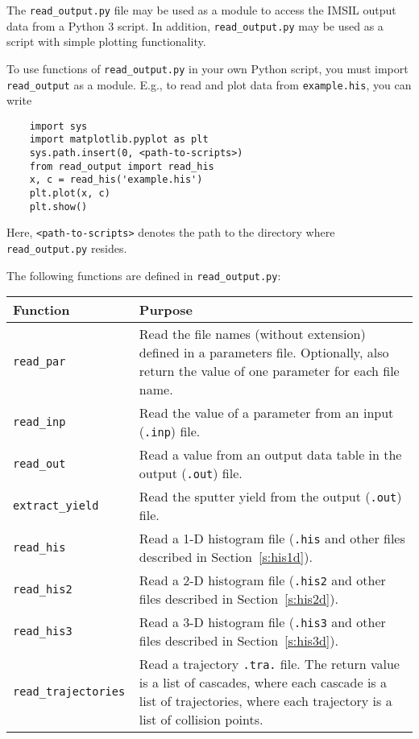 The \texttt{read\_output.py} file may be used as a module to access the IMSIL
output data from a Python 3 script. In addition, \texttt{read\_output.py} may be
used as a script with simple plotting functionality. 

To use functions of \texttt{read\_output.py} in your own Python script, you must
import \texttt{read\_output} as a module. E.g., to read and plot data from
\texttt{example.his}, you can write
%
\begin{verbatim}
    import sys
    import matplotlib.pyplot as plt
    sys.path.insert(0, <path-to-scripts>)
    from read_output import read_his
    x, c = read_his('example.his')
    plt.plot(x, c)
    plt.show()
\end{verbatim}
%
Here, \texttt{<path-to-scripts>} denotes the path to the directory where
\texttt{read\_output.py} resides.

The following functions are defined in \texttt{read\_output.py}:
\bigskip
%
\begin{center}
\begin{tabular}{|l|p{}|}
\hline
Function           & Purpose \\
\hline
\tt read\_par      & Read the file names (without extension) defined in a
                     parameters file. Optionally, also return the value of one
                     parameter for each file name. \\
\tt read\_inp      & Read the value of a parameter from an input (\texttt{.inp})
                     file. \\
\tt read\_out      & Read a value from an output data table in the output
                     (\texttt{.out}) file. \\
\tt extract\_yield & Read the sputter yield from the output (\texttt{.out})
                     file. \\
\tt read\_his      & Read a 1-D histogram file (\texttt{.his} and other files
                     described in Section~\ref{s:his1d}). \\
\tt read\_his2     & Read a 2-D histogram file (\texttt{.his2} and other files
                     described in Section~\ref{s:his2d}). \\
\tt read\_his3     & Read a 3-D histogram file (\texttt{.his3} and other files
                     described in Section~\ref{s:his3d}). \\
\tt read\_trajectories & Read a trajectory \texttt{.tra.} file. The return value
                     is a list of cascades, where each cascade is a list of
                     trajectories, where each trajectory is a list of collision
                     points. \\
\hline
\end{tabular}
\end{center}

